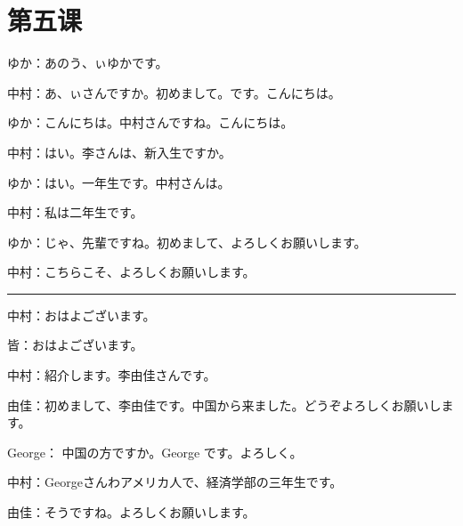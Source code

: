 \langJP

\section{第五课 }

ゆか：あのう、ぃゆかです。

中村：あ、ぃさんですか。初めまして。です。こんにちは。

ゆか：こんにちは。中村さんですね。こんにちは。

中村：はい。李さんは、新入生ですか。

ゆか：はい。一年生です。中村さんは。

中村：私は二年生です。

ゆか：じゃ、先輩ですね。初めまして、よろしくお願いします。

中村：こちらこそ、よろしくお願いします。

\rule{5cm}{1pt}

中村：おはよございます。

皆：おはよございます。

中村：紹介します。李由佳さんです。

由佳：初めまして、李由佳です。中国から来ました。どうぞよろしくお願いします。

George： 中国の方ですか。George です。よろしく。

中村：Georgeさんわアメリカ人で、経済学部の三年生です。

由佳：そうですね。よろしくお願いします。


